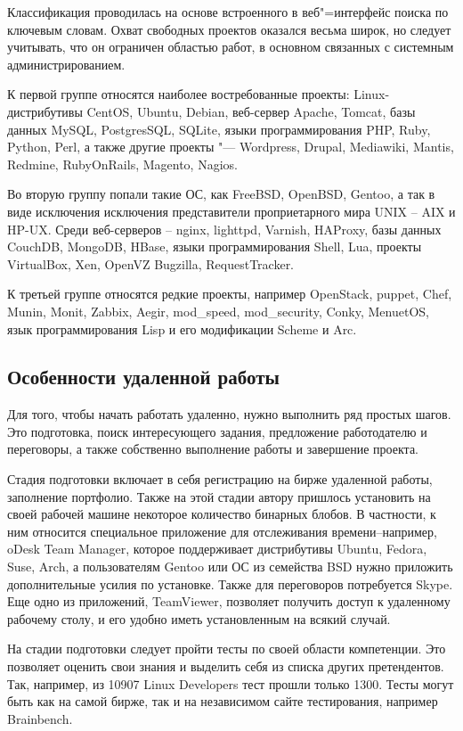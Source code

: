 \documentclass[10pt, a5paper]{article}
\begin{document}
Классификация проводилась на основе встроенного в веб"=интерфейс поиска по ключевым словам. Охват свободных проектов оказался весьма широк, но следует учитывать, что он ограничен областью работ, в основном связанных с системным администрированием.

К первой группе относятся наиболее востребованные проекты: Linux-дистрибутивы CentOS, Ubuntu, Debian, веб-сервер Apache, Tomcat, базы данных MySQL, PostgresSQL, SQLite, языки программирования PHP, Ruby, Python, Perl, а также другие проекты "--- Wordpress, Drupal, Mediawiki, Mantis, Redmine, \linebreak RubyOnRails, Magento, Nagios.

Во вторую группу попали такие ОС, как FreeBSD, OpenBSD,  Gentoo, а так в виде исключения исключения представители проприетарного мира UNIX -- AIX и HP-UX. Среди веб-серверов -- nginx, lighttpd, Varnish, HAProxy, базы данных CouchDB, MongoDB, HBase, языки программирования Shell, Lua, проекты VirtualBox, Xen, OpenVZ Bugzilla, RequestTracker.

К третьей группе относятся редкие проекты, например \linebreak OpenStack, puppet, Chef, Munin, Monit, Zabbix, Aegir, mod\_speed, mod\_security, Conky, MenuetOS,  язык программирования Lisp и его модификации Scheme и Arc.

\subsection*{Особенности удаленной работы}

Для того, чтобы  начать работать удаленно, нужно выполнить ряд простых шагов. Это подготовка, поиск интересующего задания, предложение работодателю и переговоры, а также собственно выполнение работы и завершение проекта.

Стадия подготовки включает в себя регистрацию на бирже удаленной работы, заполнение портфолио. Также на этой стадии автору пришлось установить на своей рабочей машине некоторое количество бинарных блобов. В частности, к ним относится  специальное  приложение для отслеживания времени--например, oDesk Team Manager, которое поддерживает дистрибутивы Ubuntu, Fedora, Suse, Arch, а пользователям Gentoo или ОС из семейства BSD нужно приложить дополнительные усилия по установке. Также для переговоров потребуется Skype. Еще одно из приложений, TeamViewer, позволяет получить доступ к удаленному рабочему столу, и его удобно иметь установленным на всякий случай.

На стадии подготовки следует пройти тесты по своей области компетенции. Это позволяет оценить свои знания и выделить себя из списка других претендентов. Так, например, из 10907 Linux Developers тест прошли только 1300. Тесты могут быть как на самой бирже, так и на независимом сайте тестирования, например Brainbench.
\end{document}
